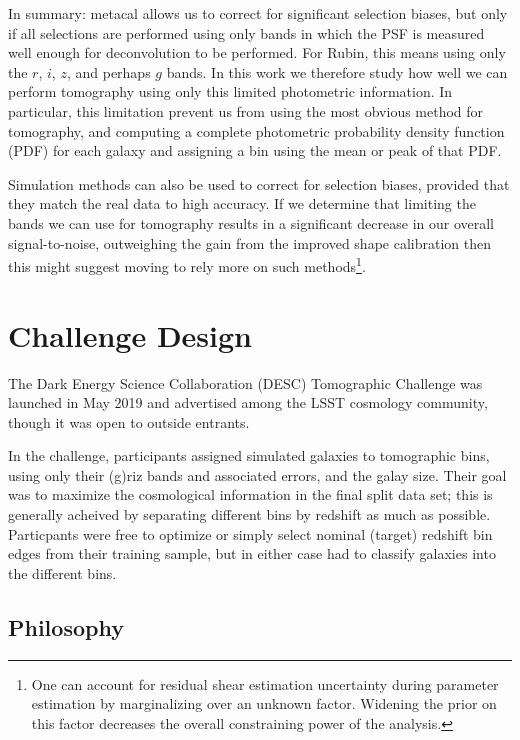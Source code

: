 \documentclass[twocolumn,twocolappendix]{aastex63}
\begin{document}
In summary: metacal allows us to correct for significant selection biases, but only if all selections
are performed using only bands in which the PSF is measured well enough for deconvolution to be
performed.  For Rubin, this means using only the $r$, $i$, $z$, and perhaps $g$ bands.  In this work we
therefore study how well we can perform tomography using only this limited photometric information.  In
particular, this limitation prevent us from using the most obvious method for tomography,
and computing a complete photometric probability density function (PDF) for each galaxy and assigning
a bin using the mean or peak of that PDF.

Simulation methods can also be used to correct for selection biases, provided that they match the
real data to high accuracy.  If we determine that limiting the bands we can use for tomography results
in a significant decrease in our overall signal-to-noise, outweighing the gain from the improved shape
calibration then this might suggest moving to rely more on such methods\footnote{One can account for
residual shear estimation uncertainty during parameter estimation by marginalizing over an unknown
factor.  Widening the prior on this factor decreases the overall constraining power of the analysis.}.


\section{Challenge Design}

The Dark Energy Science Collaboration (DESC) Tomographic Challenge was launched in May 2019 and 
advertised among the LSST cosmology community, though it was open to outside entrants.

In the challenge, participants assigned simulated galaxies to tomographic bins,
using only their (g)riz bands and associated errors, and the galay size.  Their goal was to maximize the cosmological
information in the final split data set; this is generally acheived by separating different bins by 
redshift as much as possible.  Particpants were free to optimize or simply select nominal (target) 
redshift bin edges from their training sample, but in either case had to classify galaxies into the 
different bins.

\subsection{Philosophy}
\end{document}
